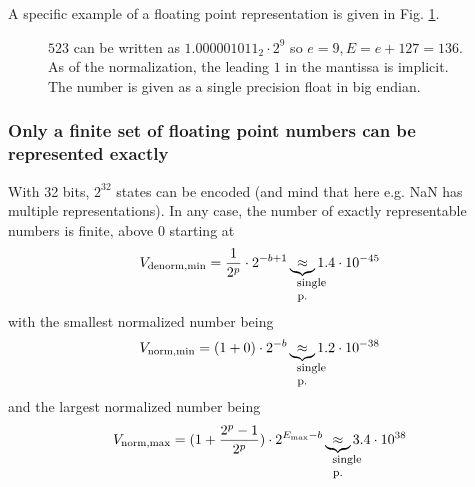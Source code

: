 
A specific example of a floating point representation is given in Fig. \ref{fig:523float}.


\begin{figure}[!htb]
    \centering
    \hfill
    \caption{$523$ can be written as $1.000001011_2 \cdot 2^9$ so $e=9, E = e + 127 = 136$. As of the normalization, the leading $1$ in the mantissa is implicit. The number is given as a single precision float in big endian.}
    \label{fig:523float}
\end{figure}

\subsubsection{Only a finite set of floating point numbers can be represented exactly}
With 32 bits, $2^{32}$ states can be encoded (and mind that here e.g. NaN has multiple representations). In any case,
the number of exactly representable numbers is finite, above $0$ starting at
\begin{equation}
    V_{\text{denorm,min}} = \frac{1}{2^p} \cdot 2^{-b+1} \explain{\approx}{single p.} 1.4 \cdot 10^{-45}
\end{equation}
with the smallest normalized number being
\begin{equation}
    V_{\text{norm,min}} = (1 + 0) \cdot 2^{-b} \explain{\approx}{single p.} 1.2 \cdot 10^{-38}
\end{equation}
and the largest normalized number being
\begin{equation}
    V_{\text{norm,max}} = (1 + \frac{2^p - 1}{2^p}) \cdot 2^{E_{\text{max}} - b} \explain{\approx}{single p.} 3.4 \cdot 10^{38}
\end{equation}

